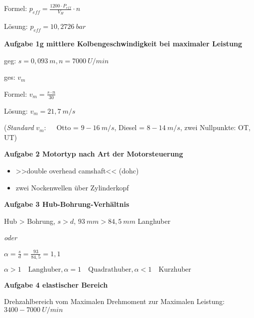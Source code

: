 Formel: $p_{eff} = \frac{1200 \cdot P_{eff}}{V_H} \cdot n$

Lösung: $p_{eff} = 10,2726~bar$

\textbf{Aufgabe 1g mittlere Kolbengeschwindigkeit bei maximaler
Leistung}

geg: $s = 0,093~m, n = 7000~U/min$

ges: $v_m$

Formel: $v_m = \frac{s \cdot n}{30}$

Lösung: $v_m = 21,7~m/s$

(\emph{Standard} $v_m: \quad$ Otto = $9 - 16~m/s$, Diesel =
$8 - 14~m/s$, zwei Nullpunkte: OT, UT)

\textbf{Aufgabe 2 Motortyp nach Art der Motorsteuerung}

\begin{itemize}
\item
  >>double overhead camshaft<< (dohc)
\item
  zwei Nockenwellen über Zylinderkopf
\end{itemize}

\textbf{Aufgabe 3 Hub-Bohrung-Verhältnis}

Hub > Bohrung, $s > d$, $93~mm > 84,5~mm$ Langhuber

\emph{oder}

$\alpha = \frac{s}{d} = \frac{93}{84,5} = 1,1$

$\boxed{\alpha > 1 \quad \text{Langhuber}, \alpha = 1 \quad \text{Quadrathuber}, \alpha < 1 \quad \text{Kurzhuber}}$

\textbf{Aufgabe 4 elastischer Bereich}

Drehzahlbereich vom Maximalen Drehmoment zur Maximalen Leistung:
$3400 - 7000~U/min$
